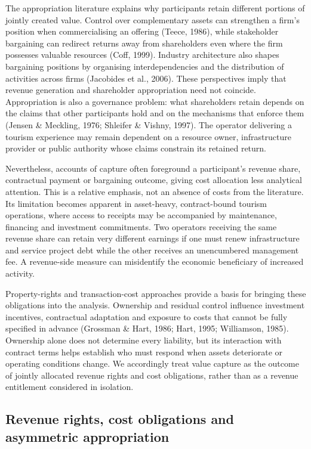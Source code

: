 \documentclass[review,3p,times]{elsarticle}
\begin{document}
The appropriation literature explains why participants retain different portions of jointly created value. Control over complementary assets can strengthen a firm's position when commercialising an offering (Teece, 1986), while stakeholder bargaining can redirect returns away from shareholders even where the firm possesses valuable resources (Coff, 1999). Industry architecture also shapes bargaining positions by organising interdependencies and the distribution of activities across firms (Jacobides et al., 2006). These perspectives imply that revenue generation and shareholder appropriation need not coincide. Appropriation is also a governance problem: what shareholders retain depends on the claims that other participants hold and on the mechanisms that enforce them (Jensen \& Meckling, 1976; Shleifer \& Vishny, 1997). The operator delivering a tourism experience may remain dependent on a resource owner, infrastructure provider or public authority whose claims constrain its retained return.

Nevertheless, accounts of capture often foreground a participant's revenue share, contractual payment or bargaining outcome, giving cost allocation less analytical attention. This is a relative emphasis, not an absence of costs from the literature. Its limitation becomes apparent in asset-heavy, contract-bound tourism operations, where access to receipts may be accompanied by maintenance, financing and investment commitments. Two operators receiving the same revenue share can retain very different earnings if one must renew infrastructure and service project debt while the other receives an unencumbered management fee. A revenue-side measure can misidentify the economic beneficiary of increased activity.

Property-rights and transaction-cost approaches provide a basis for bringing these obligations into the analysis. Ownership and residual control influence investment incentives, contractual adaptation and exposure to costs that cannot be fully specified in advance (Grossman \& Hart, 1986; Hart, 1995; Williamson, 1985). Ownership alone does not determine every liability, but its interaction with contract terms helps establish who must respond when assets deteriorate or operating conditions change. We accordingly treat value capture as the outcome of jointly allocated revenue rights and cost obligations, rather than as a revenue entitlement considered in isolation.

\subsection{Revenue rights, cost obligations and asymmetric appropriation}
\end{document}
